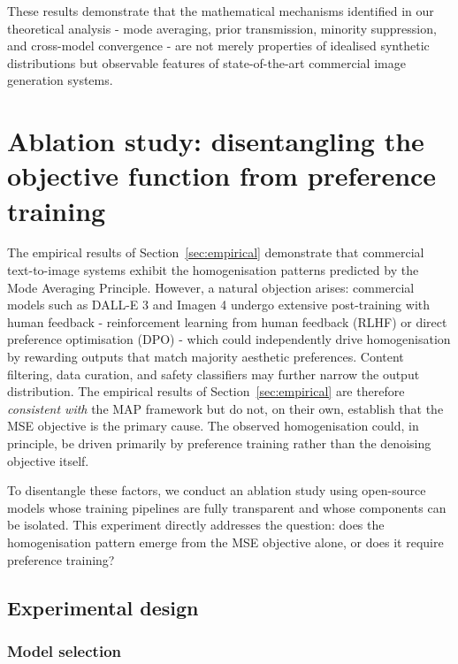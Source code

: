\documentclass[11pt]{article}
\begin{document}
These results demonstrate that the mathematical mechanisms identified in our theoretical analysis - mode averaging, prior transmission, minority suppression, and cross-model convergence - are not merely properties of idealised synthetic distributions but observable features of state-of-the-art commercial image generation systems.

\section{Ablation study: disentangling the objective function from preference training}\label{sec:ablation}

The empirical results of Section~\ref{sec:empirical} demonstrate that commercial text-to-image systems exhibit the homogenisation patterns predicted by the Mode Averaging Principle. However, a natural objection arises: commercial models such as DALL-E 3 and Imagen 4 undergo extensive post-training with human feedback - reinforcement learning from human feedback (RLHF) or direct preference optimisation (DPO) - which could independently drive homogenisation by rewarding outputs that match majority aesthetic preferences. Content filtering, data curation, and safety classifiers may further narrow the output distribution. The empirical results of Section~\ref{sec:empirical} are therefore \textit{consistent with} the MAP framework but do not, on their own, establish that the MSE objective is the primary cause. The observed homogenisation could, in principle, be driven primarily by preference training rather than the denoising objective itself.

To disentangle these factors, we conduct an ablation study using open-source models whose training pipelines are fully transparent and whose components can be isolated. This experiment directly addresses the question: does the homogenisation pattern emerge from the MSE objective alone, or does it require preference training?

\subsection{Experimental design}\label{sec:ablation_design}

\subsubsection{Model selection}
\end{document}
